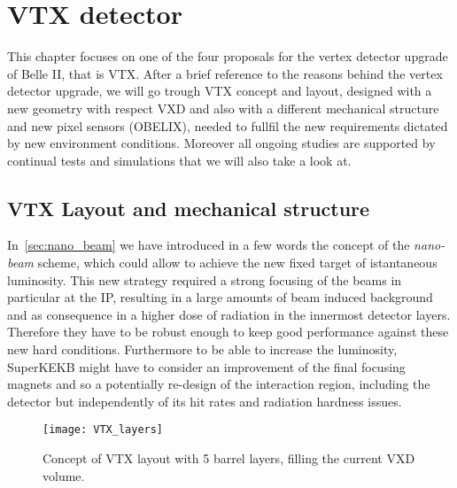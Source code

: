 \chapter{VTX detector}


This chapter focuses on one of the four proposals for the vertex detector upgrade of Belle II, that is VTX. After a brief reference to the reasons behind the vertex detector upgrade, we will go trough VTX concept and layout, designed with a new geometry with respect VXD and also with a different mechanical structure and new pixel sensors (OBELIX), needed to fullfil the new requirements dictated by new environment conditions. Moreover all ongoing studies are supported by continual tests and simulations that we will also take a look at.


\section{VTX Layout and mechanical structure}

In~\autoref{sec:nano_beam} we have introduced in a few words the concept of the \textit{nano-beam} scheme, which could allow to achieve the new fixed target of istantaneous luminosity. This new strategy required a strong focusing of the beams in particular at the IP, resulting in a large amounts of beam induced background and as consequence in a higher dose of radiation in the innermost detector layers. Therefore they have to be robust enough to keep good performance against these new hard conditions.
Furthermore to be able to increase the luminosity, SuperKEKB might have to consider an improvement of the final focusing magnets and so a potentially re-design of the interaction region, including the detector but independently of its hit rates and radiation hardness issues.\\

\begin{figure}[h!]
\centering
\texttt{[image: VTX\_layers]}
\caption{Concept of VTX layout with 5 barrel layers, filling the current VXD volume.}
\label{fig:VTX_layers}
\end{figure}


